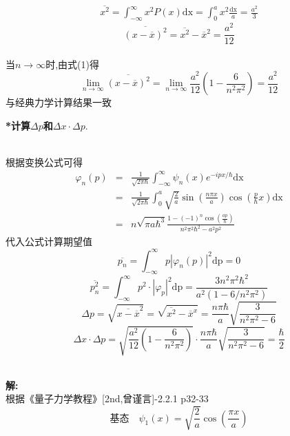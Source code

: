 \documentclass[a4paper]{article}
\begin{document}
\begin{CJK*}{UTF8}{song}
{$$    $$
    \begin{eqnarray}
        \overline{x^{2}}  =  \int_{-\infty}^{\infty}x^{2} P(x) \mathrm{d x}
             =  \int_{0}^{a}x^{2} \frac{\mathrm{d x}}{a}
             =  \frac{a^{2}}{3} \nonumber
    \end{eqnarray}
    $$ \overline{( x - \overline{x})^{2}} = \overline{x^{2}} - \overline{x}^{2}
        = \frac{a^{2}}{12}$$ \\[8pt]
    当$n\rightarrow\infty$时,由式(1)得
    $$\lim_{n\rightarrow\infty} \overline{( x - \overline{x})^{2}} 
        = \lim_{n\rightarrow\infty} \frac{a^{2}}{12} ( 1 - \frac{6}{n^{2} {\pi}^{2}}) = \frac{a^{2}}{12}
        $$
    与经典力学计算结果一致\\[15pt]      
    \begin{CJK*}{UTF8}{kai}
    \noindent\textbf{*计算$\Delta p$和$\Delta x\cdot\Delta p.$}
    \end{CJK*}
    \\[15pt] 根据变换公式可得
    \begin{eqnarray}
        \varphi_{n}(p) & = & \frac{1}{\sqrt{2\pi\hbar}} \int_{-\infty}^{\infty}\psi_{n}(x) e ^{ - i p x / \hbar}\mathrm{d x}\nonumber \\[7pt]
            & = & \frac{1}{\sqrt{2\pi\hbar}} \int_{0}^{a} \sqrt{\frac{2}{a}} \sin (\frac{n \pi x}{a})\cos (\frac{p}{\hbar} x) \mathrm{d x}\nonumber\\[7pt]
                & = & n \sqrt{\pi a \hbar^{3}}
                \frac{1 - (-1)^{n} \cos (\frac{a p}{\hbar}) }{n^{2} {\pi}^{2} {\hbar}^{2} - a^{2} p^{2}} \nonumber
    \end{eqnarray}
    代入公式计算期望值
    $$\overline{p_{n}} = \int_{-\infty}^{\infty} p |\varphi_{n}(p)|^{2} \mathrm{d p} = 0 $$
    $$\overline{p_{n}^{2}} = \int_{-\infty}^{\infty} p^{2}\cdot |\varphi_{p}|^{2} \mathrm{d p}
        = \frac{3 n^{2} {\pi}^{2} {\hbar}^{2}}{a^{2} ( 1 - 6/n^{2}{\pi}^{2})}
        $$
    $$\Delta p = \sqrt{\overline{x-\overline{x}}^{2}} = \sqrt{\overline{x^{2}}-\overline{x}^{x}}
        = \frac{n \pi \hbar}{a}\sqrt{\frac{3}{n^{2} {\pi}^{2} - 6}}
        $$
    $$\Delta x \cdot \Delta p =
        \sqrt{\frac{a^{2}}{12}(1-\frac{6}{n^{2}{\pi}^{2}})}
        \cdot
        \frac{n \pi \hbar}{a}\sqrt{\frac{3}{n^{2} {\pi}^{2} - 6}}
        = \frac{\hbar}{2}
        $$
    }\\[20pt]
     \textbf{解:}\\[12pt]
    {
    根据《量子力学教程》[2nd,曾谨言]-2.2.1 p32-33
     $$\mbox{基态} \quad \psi_{1}(x) = \sqrt{\frac{2}{a}}\cos(\frac{\pi x}{a})$$
}
\end{CJK*}
\end{document}
